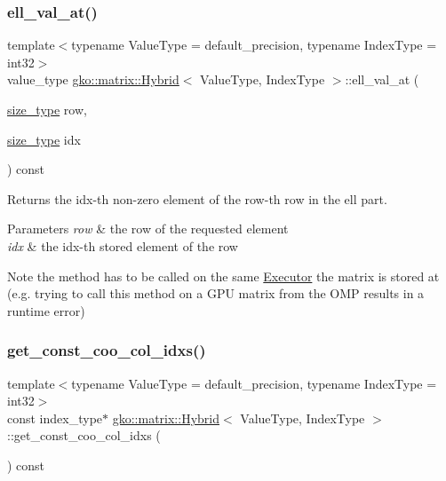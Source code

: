 \subsubsection{\texorpdfstring{ell\+\_\+val\+\_\+at()}{ell\_val\_at()}\hspace{0.1cm}{\footnotesize\ttfamily [2/2]}}
{\footnotesize\ttfamily template$<$typename Value\+Type = default\+\_\+precision, typename Index\+Type = int32$>$ \\
value\+\_\+type \hyperlink{classgko_1_1matrix_1_1Hybrid}{gko\+::matrix\+::\+Hybrid}$<$ Value\+Type, Index\+Type $>$\+::ell\+\_\+val\+\_\+at (\begin{DoxyParamCaption}\item[{\hyperlink{namespacegko_a6e5c95df0ae4e47aab2f604a22d98ee7}{size\+\_\+type}}]{row,  }\item[{\hyperlink{namespacegko_a6e5c95df0ae4e47aab2f604a22d98ee7}{size\+\_\+type}}]{idx }\end{DoxyParamCaption}) const\hspace{0.3cm}{\ttfamily [noexcept]}}



Returns the {\ttfamily idx}-\/th non-\/zero element of the {\ttfamily row}-\/th row in the ell part. 


\begin{DoxyParams}{Parameters}
{\em row} & the row of the requested element \\
\hline
{\em idx} & the idx-\/th stored element of the row\\
\hline
\end{DoxyParams}
\begin{DoxyNote}{Note}
the method has to be called on the same \hyperlink{classgko_1_1Executor}{Executor} the matrix is stored at (e.\+g. trying to call this method on a G\+PU matrix from the O\+MP results in a runtime error) 
\end{DoxyNote}
\mbox{\label{classgko_1_1matrix_1_1Hybrid_ab637e1576b6449407ee2b57ac203e0f7}} 
\subsubsection{\texorpdfstring{get\+\_\+const\+\_\+coo\+\_\+col\+\_\+idxs()}{get\_const\_coo\_col\_idxs()}}
{\footnotesize\ttfamily template$<$typename Value\+Type = default\+\_\+precision, typename Index\+Type = int32$>$ \\
const index\+\_\+type$\ast$ \hyperlink{classgko_1_1matrix_1_1Hybrid}{gko\+::matrix\+::\+Hybrid}$<$ Value\+Type, Index\+Type $>$\+::get\+\_\+const\+\_\+coo\+\_\+col\+\_\+idxs (\begin{DoxyParamCaption}{ }\end{DoxyParamCaption}) const\hspace{0.3cm}{\ttfamily [noexcept]}}



